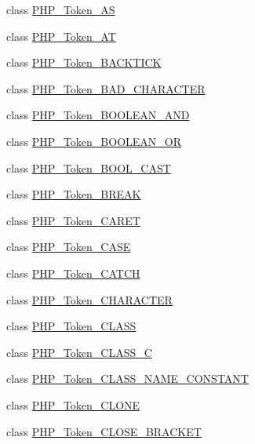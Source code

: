 \begin{DoxyCompactItemize}
class \mbox{\hyperlink{class_p_h_p___token___a_s}{P\+H\+P\+\_\+\+Token\+\_\+\+AS}}
\item 
class \mbox{\hyperlink{class_p_h_p___token___a_t}{P\+H\+P\+\_\+\+Token\+\_\+\+AT}}
\item 
class \mbox{\hyperlink{class_p_h_p___token___b_a_c_k_t_i_c_k}{P\+H\+P\+\_\+\+Token\+\_\+\+B\+A\+C\+K\+T\+I\+CK}}
\item 
class \mbox{\hyperlink{class_p_h_p___token___b_a_d___c_h_a_r_a_c_t_e_r}{P\+H\+P\+\_\+\+Token\+\_\+\+B\+A\+D\+\_\+\+C\+H\+A\+R\+A\+C\+T\+ER}}
\item 
class \mbox{\hyperlink{class_p_h_p___token___b_o_o_l_e_a_n___a_n_d}{P\+H\+P\+\_\+\+Token\+\_\+\+B\+O\+O\+L\+E\+A\+N\+\_\+\+A\+ND}}
\item 
class \mbox{\hyperlink{class_p_h_p___token___b_o_o_l_e_a_n___o_r}{P\+H\+P\+\_\+\+Token\+\_\+\+B\+O\+O\+L\+E\+A\+N\+\_\+\+OR}}
\item 
class \mbox{\hyperlink{class_p_h_p___token___b_o_o_l___c_a_s_t}{P\+H\+P\+\_\+\+Token\+\_\+\+B\+O\+O\+L\+\_\+\+C\+A\+ST}}
\item 
class \mbox{\hyperlink{class_p_h_p___token___b_r_e_a_k}{P\+H\+P\+\_\+\+Token\+\_\+\+B\+R\+E\+AK}}
\item 
class \mbox{\hyperlink{class_p_h_p___token___c_a_r_e_t}{P\+H\+P\+\_\+\+Token\+\_\+\+C\+A\+R\+ET}}
\item 
class \mbox{\hyperlink{class_p_h_p___token___c_a_s_e}{P\+H\+P\+\_\+\+Token\+\_\+\+C\+A\+SE}}
\item 
class \mbox{\hyperlink{class_p_h_p___token___c_a_t_c_h}{P\+H\+P\+\_\+\+Token\+\_\+\+C\+A\+T\+CH}}
\item 
class \mbox{\hyperlink{class_p_h_p___token___c_h_a_r_a_c_t_e_r}{P\+H\+P\+\_\+\+Token\+\_\+\+C\+H\+A\+R\+A\+C\+T\+ER}}
\item 
class \mbox{\hyperlink{class_p_h_p___token___c_l_a_s_s}{P\+H\+P\+\_\+\+Token\+\_\+\+C\+L\+A\+SS}}
\item 
class \mbox{\hyperlink{class_p_h_p___token___c_l_a_s_s___c}{P\+H\+P\+\_\+\+Token\+\_\+\+C\+L\+A\+S\+S\+\_\+C}}
\item 
class \mbox{\hyperlink{class_p_h_p___token___c_l_a_s_s___n_a_m_e___c_o_n_s_t_a_n_t}{P\+H\+P\+\_\+\+Token\+\_\+\+C\+L\+A\+S\+S\+\_\+\+N\+A\+M\+E\+\_\+\+C\+O\+N\+S\+T\+A\+NT}}
\item 
class \mbox{\hyperlink{class_p_h_p___token___c_l_o_n_e}{P\+H\+P\+\_\+\+Token\+\_\+\+C\+L\+O\+NE}}
\item 
class \mbox{\hyperlink{class_p_h_p___token___c_l_o_s_e___b_r_a_c_k_e_t}{P\+H\+P\+\_\+\+Token\+\_\+\+C\+L\+O\+S\+E\+\_\+\+B\+R\+A\+C\+K\+ET}}

\end{DoxyCompactItemize}
